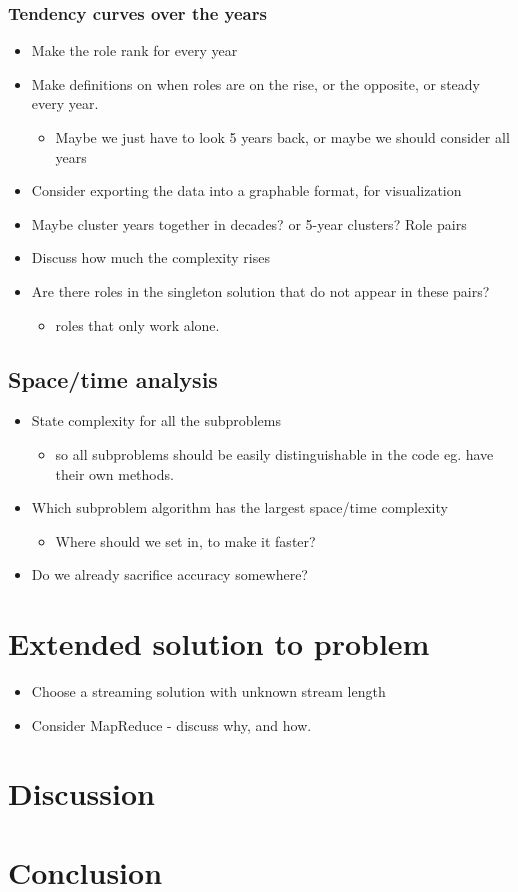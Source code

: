 \documentclass[a4paper,11pt]{article}
\begin{document}
\subsubsection{Tendency curves over the years}
\begin{itemize}
    \item Make the role rank for every year
    \item Make definitions on when roles are on the rise, or the opposite, or steady every year.
    \begin{itemize}
        \item Maybe we just have to look 5 years back, or maybe we should consider all years
    \end{itemize}
    \item Consider exporting the data into a graphable format, for visualization
    \item Maybe cluster years together in decades? or 5-year clusters?
Role pairs
    \item Discuss how much the complexity rises
    \item Are there roles in the singleton solution that do not appear in these pairs?
    \begin{itemize}
        \item roles that only work alone.
    \end{itemize}
\end{itemize}

\subsection{Space/time analysis}
\begin{itemize}
    \item State complexity for all the subproblems
    \begin{itemize}
        \item so all subproblems should be easily distinguishable in the code eg. have their own methods.
    \end{itemize}
    \item Which subproblem algorithm has the largest space/time complexity
    \begin{itemize}
        \item Where should we set in, to make it faster?
    \end{itemize}
    \item Do we already sacrifice accuracy somewhere?
\end{itemize}



\section{Extended solution to problem}
\begin{itemize}
    \item Choose a streaming solution with unknown stream length 
    \item Consider MapReduce - discuss why, and how.
\end{itemize}

\section{Discussion}
\section{Conclusion}
\end{document}
